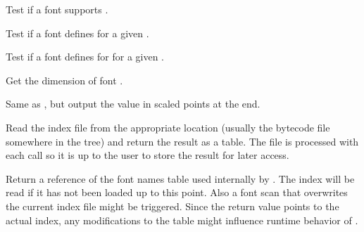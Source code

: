             Test if a font supports .
  \endaltitem

            Test if a font defines  for a given
            .
  \endaltitem

            Test if a font defines  for
             for a given .
  \endaltitem

            Get the dimension  of font .
  \endaltitem

            Same as , but output the value
            in scaled points at the \TEX end.
  \endaltitem

\endfunctionlist

\endsubsubsection


\beginfunctionlist
%
            Read the index file from the appropriate location (usually
            the bytecode file  somewhere
            in the  tree) and return the result as a
            table. The file is processed with each call so it is up to
            the user to store the result for later access.
  \endaltitem

            Return a reference of the font names table used internally
            by . The index will be read if it
            has not been loaded up to this point. Also a font scan that
            overwrites the current index file might be triggered. Since
            the return value points to the actual index, any
            modifications to the table might influence runtime behavior
            of .
  \endaltitem

\endfunctionlist

